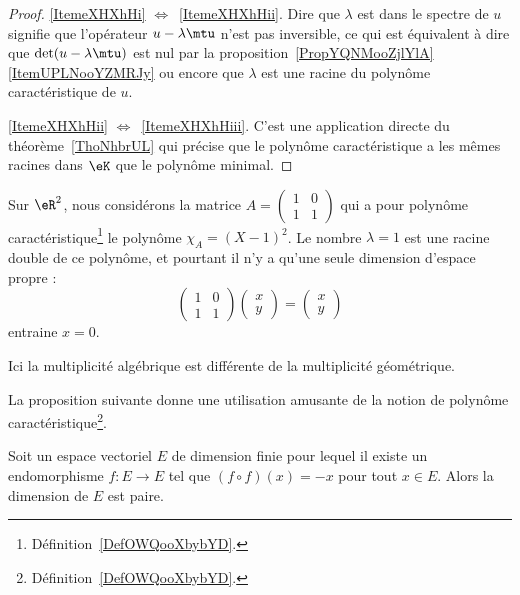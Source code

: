 \begin{proof}
	\ref{ItemeXHXhHi} \( \Leftrightarrow\)~\ref{ItemeXHXhHii}. Dire que \( \lambda\) est dans le spectre de \( u\) signifie que l'opérateur \( u-\lambda\mtu\) n'est pas inversible, ce qui est équivalent à dire que \( \det(u-\lambda\mtu)\) est nul par la proposition~\ref{PropYQNMooZjlYlA}\ref{ItemUPLNooYZMRJy} ou encore que \( \lambda\) est une racine du polynôme caractéristique de \( u\).

	\ref{ItemeXHXhHii} \( \Leftrightarrow\)~\ref{ItemeXHXhHiii}. C'est une application directe du théorème~\ref{ThoNhbrUL} qui précise que le polynôme caractéristique a les mêmes racines dans \(\eK\) que le polynôme minimal.
\end{proof}

\begin{example} \label{ExICOJcFp}
	Sur \( \eR^2\), nous considérons la matrice \( A=\begin{pmatrix}
		1 & 0 \\
		1 & 1
	\end{pmatrix}\) qui a pour polynôme caractéristique\footnote{Définition~\ref{DefOWQooXbybYD}.} le polynôme \( \chi_A=(X-1)^2\). Le nombre \( \lambda=1\) est une racine double de ce polynôme, et pourtant il n'y a qu'une seule dimension d'espace propre :
	\begin{equation}
		\begin{pmatrix}
			1 & 0 \\
			1 & 1
		\end{pmatrix}\begin{pmatrix}
			x \\
			y
		\end{pmatrix}=\begin{pmatrix}
			x \\
			y
		\end{pmatrix}
	\end{equation}
	entraine \( x=0\).

	Ici la multiplicité algébrique est différente de la multiplicité géométrique.
\end{example}

La proposition suivante donne une utilisation amusante de la notion de polynôme caractéristique\footnote{Définition~\ref{DefOWQooXbybYD}.}.
\begin{proposition}      \label{PROPooKJWOooOjSFaA}
	Soit un espace vectoriel \( E\) de dimension finie pour lequel il existe un endomorphisme \( f\colon E\to E\) tel que \( (f\circ f)(x)=-x\) pour tout \( x\in E\). Alors la dimension de \( E\) est paire.
\end{proposition}

